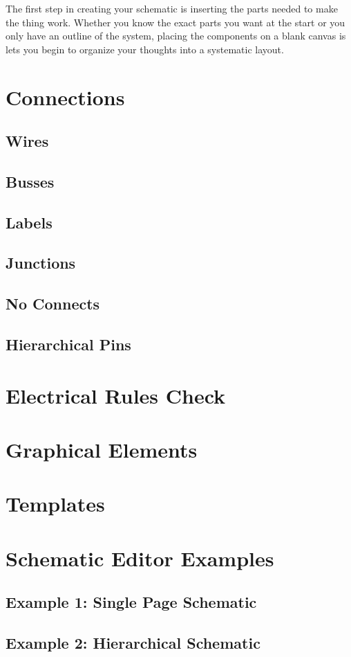 The first step in creating your schematic is inserting the parts needed to make the thing work.
Whether you know the exact parts you want at the start or you only have an outline of the system, placing the components on a blank canvas is lets you begin to organize your thoughts into a systematic layout.



\section{Connections}
\subsection{Wires}
\subsection{Busses}
\subsection{Labels}
\subsection{Junctions}
\subsection{No Connects}
\subsection{Hierarchical Pins}

\section{Electrical Rules Check}

\section{Graphical Elements}

\section{Templates}

\section{Schematic Editor Examples}
\subsection{Example 1: Single Page Schematic}
\subsection{Example 2: Hierarchical Schematic}